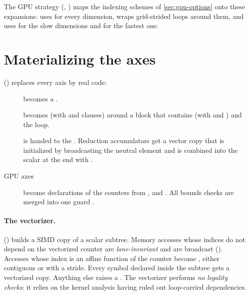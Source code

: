 The GPU strategy (, ) maps
the indexing schemes of \cref{sec:gpu-options} onto these expansions:
 uses  for every dimension,
 wraps grid-strided loops around them, and
 uses  for the slow dimensions and
 for the fastest one.

\section{Materializing the axes}

 () replaces every axis by real code:
\begin{description}
  \item[] becomes a .
  \item[] becomes
     (with  and  clauses)
    around a block that contains  (with  and
    ) and the loop.
  \item[] is handed to the . Reduction accumulators
    get a vector copy that is initialized by broadcasting the neutral element and is
    combined into the scalar at the end with .
  \item[GPU axes] become declarations of the counters from ,
     and . All bounds checks are merged into one guard
    .
\end{description}

\paragraph{The vectorizer.}
 () builds a SIMD copy of a scalar subtree.
Memory accesses whose indices do not depend on the vectorized counter are
\emph{lane-invariant} and are broadcast (). Accesses whose index is
an affine function of the counter become , either contiguous or with a
stride. Every symbol declared inside the subtree gets a vectorized copy. Anything else
raises a . The vectorizer performs \emph{no legality checks}:
it relies on the kernel analysis having ruled out loop-carried dependencies.


